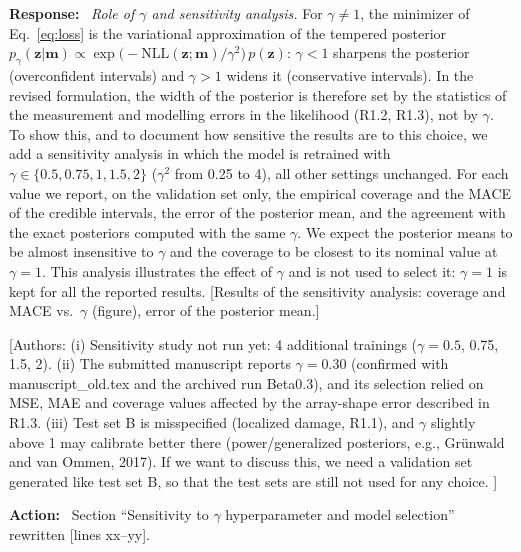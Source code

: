 \documentclass[11pt]{article}
\newenvironment{response}{\par\smallskip\noindent\color{resp}\textbf{Response:}\ }{\par}
\newenvironment{action}{\par\smallskip\noindent\color{resp}\textbf{Action:}\ }{\par}
\newcommand{\authornote}[1]{\textcolor{note}{\textsf{[Authors: #1]}}}
\newcommand{\tbd}[1]{\textcolor{note}{\textsf{[#1]}}}
\newcommand{\lines}[1]{\tbd{lines #1}}
\newcommand{\m}{\mathbf{m}}
\newcommand{\z}{\mathbf{z}}
\begin{document}
\begin{response}
\textit{Role of $\gamma$ and sensitivity analysis.} For $\gamma\neq1$, the minimizer of Eq.~\eqref{eq:loss} is the
variational approximation of the tempered posterior $p_\gamma(\z|\m)\propto\exp\big(-\mathrm{NLL}(\z;\m)/\gamma^2\big)\,
p(\z)$: $\gamma<1$ sharpens the posterior (overconfident intervals) and $\gamma>1$ widens it (conservative intervals).
In the revised formulation, the width of the posterior is therefore set by the statistics of the measurement and
modelling errors in the likelihood (R1.2, R1.3), not by $\gamma$. To show this, and to document how sensitive the
results are to this choice, we add a sensitivity analysis in which the model is retrained with
$\gamma\in\{0.5,0.75,1,1.5,2\}$ ($\gamma^2$ from 0.25 to 4), all other settings unchanged. For each value we report,
on the validation set only, the empirical coverage and the MACE of the credible intervals, the error of the posterior
mean, and the agreement with the exact posteriors computed with the same $\gamma$. We expect the posterior means to be
almost insensitive to $\gamma$ and the coverage to be closest to its nominal value at $\gamma=1$. This analysis
illustrates the effect of $\gamma$ and is not used to select it: $\gamma=1$ is kept for all the reported results.
\tbd{Results of the sensitivity analysis: coverage and MACE vs.\ $\gamma$ (figure), error of the posterior mean.}
\end{response}
\authornote{(i) Sensitivity study not run yet: 4 additional trainings ($\gamma=0.5$, 0.75, 1.5, 2). (ii) The submitted
manuscript reports $\gamma=0.30$ (confirmed with manuscript\_old.tex and the archived run Beta0.3), and its selection
relied on MSE, MAE and coverage values affected by the array-shape error described in R1.3. (iii) Test set B is misspecified (localized damage, R1.1), and $\gamma$ slightly above 1 may calibrate better
there (power/generalized posteriors, e.g., Gr\"unwald and van Ommen, 2017). If we want to discuss this, we need a
validation set generated like test set B, so that the test sets are still not used for any choice. }

\begin{action}
Section ``Sensitivity to $\gamma$ hyperparameter and model selection'' rewritten \lines{xx--yy}.
\end{action}
\end{document}

